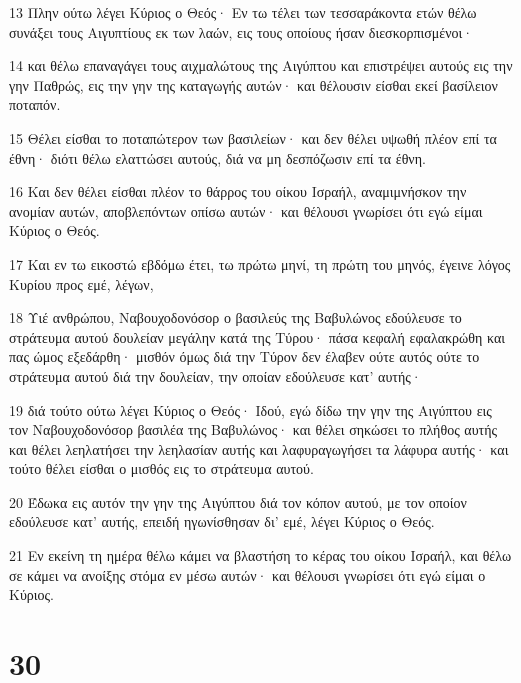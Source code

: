 \par 13 Πλην ούτω λέγει Κύριος ο Θεός· Εν τω τέλει των τεσσαράκοντα ετών θέλω συνάξει τους Αιγυπτίους εκ των λαών, εις τους οποίους ήσαν διεσκορπισμένοι·
\par 14 και θέλω επαναγάγει τους αιχμαλώτους της Αιγύπτου και επιστρέψει αυτούς εις την γην Παθρώς, εις την γην της καταγωγής αυτών· και θέλουσιν είσθαι εκεί βασίλειον ποταπόν.
\par 15 Θέλει είσθαι το ποταπώτερον των βασιλείων· και δεν θέλει υψωθή πλέον επί τα έθνη· διότι θέλω ελαττώσει αυτούς, διά να μη δεσπόζωσιν επί τα έθνη.
\par 16 Και δεν θέλει είσθαι πλέον το θάρρος του οίκου Ισραήλ, αναμιμνήσκον την ανομίαν αυτών, αποβλεπόντων οπίσω αυτών· και θέλουσι γνωρίσει ότι εγώ είμαι Κύριος ο Θεός.
\par 17 Και εν τω εικοστώ εβδόμω έτει, τω πρώτω μηνί, τη πρώτη του μηνός, έγεινε λόγος Κυρίου προς εμέ, λέγων,
\par 18 Υιέ ανθρώπου, Ναβουχοδονόσορ ο βασιλεύς της Βαβυλώνος εδούλευσε το στράτευμα αυτού δουλείαν μεγάλην κατά της Τύρου· πάσα κεφαλή εφαλακρώθη και πας ώμος εξεδάρθη· μισθόν όμως διά την Τύρον δεν έλαβεν ούτε αυτός ούτε το στράτευμα αυτού διά την δουλείαν, την οποίαν εδούλευσε κατ' αυτής·
\par 19 διά τούτο ούτω λέγει Κύριος ο Θεός· Ιδού, εγώ δίδω την γην της Αιγύπτου εις τον Ναβουχοδονόσορ βασιλέα της Βαβυλώνος· και θέλει σηκώσει το πλήθος αυτής και θέλει λεηλατήσει την λεηλασίαν αυτής και λαφυραγωγήσει τα λάφυρα αυτής· και τούτο θέλει είσθαι ο μισθός εις το στράτευμα αυτού.
\par 20 Έδωκα εις αυτόν την γην της Αιγύπτου διά τον κόπον αυτού, με τον οποίον εδούλευσε κατ' αυτής, επειδή ηγωνίσθησαν δι' εμέ, λέγει Κύριος ο Θεός.
\par 21 Εν εκείνη τη ημέρα θέλω κάμει να βλαστήση το κέρας του οίκου Ισραήλ, και θέλω σε κάμει να ανοίξης στόμα εν μέσω αυτών· και θέλουσι γνωρίσει ότι εγώ είμαι ο Κύριος.

\chapter{30}

